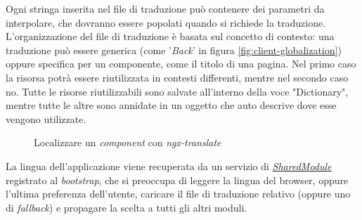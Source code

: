 \noindent
Ogni stringa inserita nel file di traduzione può contenere dei parametri da interpolare, che dovranno essere popolati quando si richiede la traduzione. L'organizzazione del file di traduzione è basata sul concetto di contesto: una traduzione può essere generica (come '\textit{Back}' in figura \ref{fig:client-globalization}) oppure specifica per un componente, come il titolo di una pagina. Nel primo caso la risorsa potrà essere riutilizzata in contesti differenti, mentre nel secondo caso no. Tutte le risorse riutilizzabili sono salvate all'interno della voce "Dictionary", mentre tutte le altre sono annidate in un oggetto che auto descrive dove esse vengono utilizzate.

 \begin{figure}[H] 
	\centering    
	
	\caption[Localizzare un \textit{component} con \textit{ngx-translate}]{Localizzare un \textit{component} con \textit{ngx-translate}}
	\label{fig:client-ngxtranslate}
\end{figure}

\noindent
La lingua dell'applicazione viene recuperata da un servizio di \hyperref[client:shared-module]{\textit{SharedModule}} registrato al \textit{bootstrap}, che si preoccupa di leggere la lingua del browser, oppure l'ultima preferenza dell'utente, caricare il file di traduzione relativo (oppure uno di \textit{fallback}) e propagare la scelta a tutti gli altri moduli.